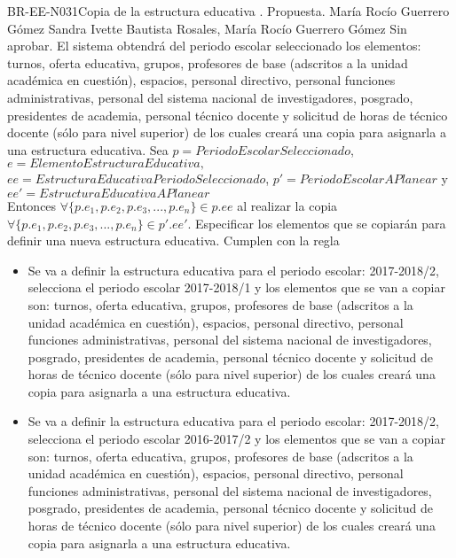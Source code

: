 \begin{BusinessRule}{BR-EE-N031}{Copia de la estructura educativa}
	{\bcIntegridad}    %
	{\btEnabler}     %
	{\blControlling}    %
	.
	\BRItem[Estado] Propuesta.
	 María Rocío Guerrero Gómez
	 Sandra Ivette Bautista Rosales, María Rocío Guerrero Gómez
	 Sin aprobar.
	\BRItem[Descripción] El sistema obtendrá del periodo escolar seleccionado los elementos: turnos, oferta educativa, grupos, profesores de base (adscritos a la unidad académica en cuestión), espacios, personal directivo, personal funciones administrativas, personal del sistema nacional de investigadores, posgrado, presidentes de academia, personal técnico docente y solicitud de horas de técnico docente (sólo para nivel superior) de los cuales creará una copia para asignarla a una estructura educativa.
	\BRItem[Sentencia]  Sea $p = PeriodoEscolarSeleccionado$, $e = ElementoEstructuraEducativa,$ \\
	$ ee = EstructuraEducativaPeriodoSeleccionado$, $p' = PeriodoEscolarAPlanear$ y $ee' = EstructuraEducativaAPlanear$ \\
	Entonces $\forall \{p.e_1,p.e_2,p.e_3,...,p.e_n\} \in p.ee$ al realizar la copia
	$ \forall \{p.e_1,p.e_2,p.e_3,...,p.e_n\} \in p'.ee'$.
	\BRItem[Motivación] Especificar los elementos que se copiarán para definir una nueva estructura educativa.
	 Cumplen con la regla
	\begin{itemize}
		\item Se va a definir la estructura educativa para el periodo escolar: 2017-2018/2, selecciona el periodo escolar 2017-2018/1 y los elementos que se van a copiar son: turnos, oferta educativa, grupos, profesores de base (adscritos a la unidad académica en cuestión), espacios, personal directivo, personal funciones administrativas, personal del sistema nacional de investigadores, posgrado, presidentes de academia, personal técnico docente y solicitud de horas de técnico docente (sólo para nivel superior) de los cuales creará una copia para asignarla a una estructura educativa.
		\item Se va a definir la estructura educativa para el periodo escolar: 2017-2018/2, selecciona el periodo escolar 2016-2017/2 y los elementos que se van a copiar son: turnos, oferta educativa, grupos, profesores de base (adscritos a la unidad académica en cuestión), espacios, personal directivo, personal funciones administrativas, personal del sistema nacional de investigadores, posgrado, presidentes de academia, personal técnico docente y solicitud de horas de técnico docente (sólo para nivel superior) de los cuales creará una copia para asignarla a una estructura educativa.

\end{itemize}
\end{BusinessRule}
